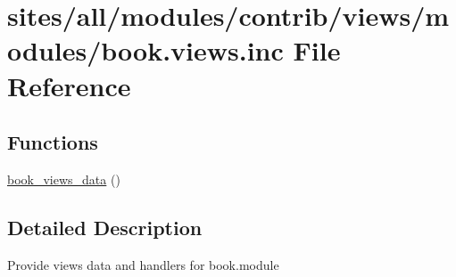 \hypertarget{book_8views_8inc}{
\section{sites/all/modules/contrib/views/modules/book.views.inc File Reference}
\label{book_8views_8inc}
}
\subsection*{Functions}
\begin{CompactItemize}
\item 
\hyperlink{group__views__book__module_gf22995b80b019a7b00c8455590690c6f}{book\_\-views\_\-data} ()
\end{CompactItemize}


\subsection{Detailed Description}
Provide views data and handlers for book.module 